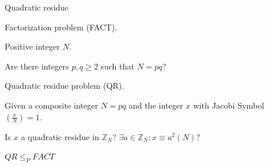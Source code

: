 \documentclass{beamer}
\begin{document}
\begin{frame}{Quadratic residue}
	\begin{description}[Question]
		\item[Name] Factorization problem (FACT).
		\item[Instance] Positive integer $N$.
		\item[Question] Are there integers $p,q\geq 2$ such that $N = pq$?
	\end{description}

	\begin{description}[Question]
		\item[Name] Quadratic residue problem (QR).
		\item[Instance] Given a composite integer $N=pq$ and the integer $x$ with Jacobi Symbol $\left( \frac{x}{N} \right) = 1$.
		\item[Question] Is $x$ a quadratic residue in ${\mathbb Z}_N$? $\exists a\in {\mathbb Z}_N : x\equiv a^2 (N)$?
	\end{description}

	\begin{theorem}
		$QR \leq_P FACT$
	\end{theorem}

\end{frame}
\end{document}
